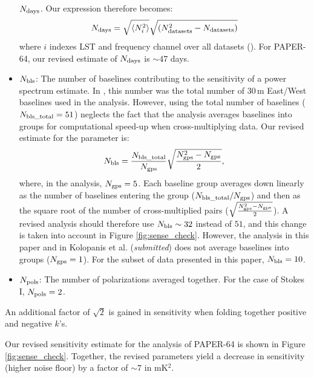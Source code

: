 \documentclass[preprint2,numberedappendix,tighten]{aastex6}  %
\begin{document}
\begin{itemize}
$N_{\rm days}$. Our expression therefore becomes:
\begin{equation}
N_{\rm days} = \sqrt{\langle N_{i}^{2}\rangle} \sqrt{(N_{\rm datasets}^{2}-N_{\rm datasets})}
 \end{equation}
\noindent where $i$ indexes LST and frequency channel over all datasets (\citealt{jacobs_et_al2015}). For PAPER-64, our revised estimate of $N_{\rm days}$ is $\sim47$ 
days.
\item $N_{\rm bls}$: The number of baselines contributing to the sensitivity of a power spectrum estimate. In , this number was 
the total number of $30$\,m East/West baselines used in the analysis. However, using the total number of baselines ($N_{\rm bls\_total} = 51$) neglects 
the fact that the  analysis averages baselines into groups for computational speed-up when cross-multiplying data. Our revised estimate for the parameter is:
\begin{equation}
N_{\rm bls} = \frac{N_{\rm bls\_total}}{N_{\rm gps}}\sqrt{\frac{N_{\rm gps}^{2}-N_{\rm gps}}{2}},
\end{equation}
\noindent where, in the  analysis, $N_{\rm gps} = 5$. Each baseline group averages down linearly as the number of baselines 
entering the group ($N_{\rm bls\_total}/N_{\rm gps}$) and then as the square root of the number of cross-multiplied pairs \Big($\sqrt{\frac{N_{\rm gps}^{2} - 
N_{\rm gps}}{2}}$\Big). A revised  analysis should therefore use $N_{\rm bls} \sim 32$ instead of $51$, and this change is taken into account in Figure \ref{fig:sense_check}. However, the analysis in this paper and in Kolopanis et al. (\textit{submitted}) does not average baselines into groups ($N_{\rm gps} = 1$). For the subset of data presented in this paper, $N_{\rm bls} = 10$.
\item $N_{\rm pols}$: The number of polarizations averaged together. For the case of Stokes I, $N_{\rm pols}=2$.
\end{itemize}

An additional factor of $\sqrt{2}$ is gained in sensitivity when folding together positive and negative $k$'s. 

Our revised sensitivity estimate for the  analysis of PAPER-64 is shown in Figure \ref{fig:sense_check}. 
Together, the revised parameters yield a decrease in sensitivity (higher noise floor) by a factor of $\sim7$ in mK$^{2}$. 
\end{document}
